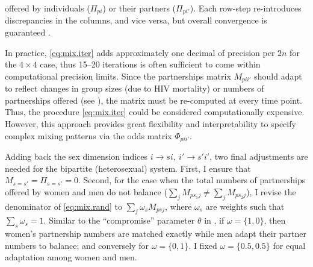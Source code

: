 offered by individuals ($\Pi_{pi}$) or their partners ($\Pi_{pi'}$).
Each row-step re-introduces discrepancies in the columns, and vice versa,
but overall convergence is guaranteed \cite{Sinkhorn1964}.
\par
In practice, \eqref{eq:mix.iter} adds approximately
one decimal of precision per $2n$ for the $4\times4$ case,
thus 15--20 iterations is often sufficient to come within computational precision limits.
Since the partnerships matrix $M_{pii'}$ should adapt to reflect changes in
group sizes (\eg due to HIV mortality) or numbers of partnerships offered (\eg see ),
the matrix must be re-computed at every time point.
Thus, the procedure \eqref{eq:mix.iter} could be considered computationally expensive.
However, this approach provides great flexibility and interpretability
to specify complex mixing patterns via the odds matrix $\Phi_{pii'}$.
\par
Adding back the sex dimension indices $i \rightarrow si, ~ i' \rightarrow s'i'$,
two final adjustments are needed for the bipartite (\ie heterosexual) system.
First, I ensure that $M_{s=s'} = \Pi_{s=s'} = 0$.
Second, for the case when the total numbers of partnerships offered by women and men
do not balance ($\sum_j M_{ps_{1}j} \ne \sum_j M_{ps_{2}j}$),
I revise the denominator of \eqref{eq:mix.rand} to $\sum_{j} \omega_s M_{psj}$,
where $\omega_s$ are weights such that $\sum_s \omega_s = 1$.
Similar to the ``compromise'' parameter $\theta$ in \cite{Garnett1994},
if $\omega = \{1,0\}$, then women's partnership numbers are matched exactly
while men adapt their partner numbers to balance;
and conversely for $\omega = \{0,1\}$.
I fixed $\omega = \{0.5,0.5\}$ for equal adaptation among women and men.
